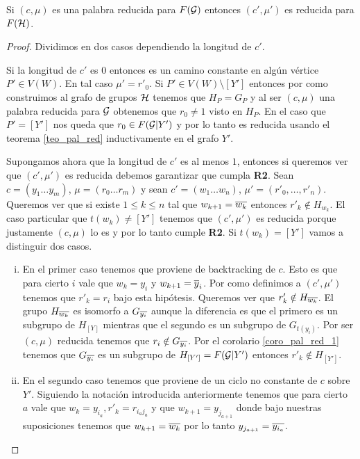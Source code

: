 \documentclass[tesis.tex]{subfiles}
\begin{document}
\begin{prop}\label{lema_pal_red_iso}
	Si $(c, \mu)$ es una palabra reducida para $F({\cal G})$ entonces $(c', \mu')$ es reducida para $F({\cal H})$.
\end{prop}
\begin{proof}
	Dividimos en dos casos dependiendo la longitud de $c'$.
	
	Si la longitud de $c'$ es  $0$ entonces es un camino constante en algún vértice $P' \in V(W)$. 
	En tal caso $\mu' = r'_0$.
	Si $P' \in V(W) \setminus [Y']$ entonces por como construimos al grafo de grupos $\cal H$ tenemos que $H_P = G_P$ y al ser $(c, \mu)$ una palabra reducida para ${\cal G}$ obtenemos que $r_0 \neq 1$ visto en $H_P$.
	En el caso que $P' = [Y']$ nos queda que $r_0 \in F({\cal G} | Y')$ y por lo tanto es reducida usando el teorema \ref{teo_pal_red} inductivamente en el grafo $Y'$.
	
	Supongamos ahora que la longitud de $c'$ es al menos $1$, entonces si queremos ver que  $(c',\mu')$ es reducida debemos garantizar que cumpla \textbf{R2}.
	Sean $c = (y_{1} \dots y_{m})$, $\mu = (r_{0} \dots r_{m})$ y sean
	$c' = (w_1 \dots w_{n})$, $\mu' = (r'_0, \dots, r'_n)$.
	Queremos ver que si existe $1 \le k \le n$ tal que  $w_{k+1} = \overline{w_k}$ entonces $r'_k \notin H_{w_k}$.		
	El caso particular que $t(w_k) \neq [Y']$ tenemos que $(c', \mu')$ es reducida porque justamente $(c, \mu)$ lo es y por lo tanto cumple \textbf{R2}.
	Si $t(w_k) = [Y']$ vamos a distinguir dos casos.
	
	\begin{enumerate}[i)]
		\item En el primer caso tenemos que proviene de backtracking de $c$.
		Esto es que para cierto $i$ vale que $w_{k} = y_i$ y  $w_{k+1} = \overline y_i$.
		Por como definimos a $(c', \mu')$ tenemos que $r'_k = r_i$ bajo esta hipótesis.
		Queremos ver que $r'_k \notin H_{\overline{w_k}}$.
		El grupo $H_{\overline{w_k}}$ es isomorfo a $G_{\overline{y_i}}$ aunque la diferencia es que el primero es un subgrupo de $H_{[Y]}$ mientras que el segundo es un subgrupo de $G_{t(y_i)}$.
		Por ser $(c, \mu)$ reducida tenemos que $r_i \notin G_{\overline{y_i}}$.
		Por el corolario \ref{coro_pal_red_1} tenemos que $G_{\overline{y_i}}$ es un subgrupo de $H_{[Y']} = F({\cal G} | Y')$ entonces $r'_k \notin H_{[Y']}$.
		
		\item En el segundo caso tenemos que proviene de un ciclo no constante de $c$ sobre $Y'$. 
		Siguiendo la notación introducida anteriormente tenemos que para cierto $a$ vale que $w_k = y_{i_a}, r'_k = r_{i_aj_a}$ y que $w_{k+1} = y_{j_{a+1}}$ donde bajo nuestras suposiciones tenemos que $w_{k+1} = \overline{w_{k}}$ por lo tanto $ y_{j_{a+1}} = \overline{y_{i_a}}$.
		

\end{enumerate}
\end{proof}
\end{document}
